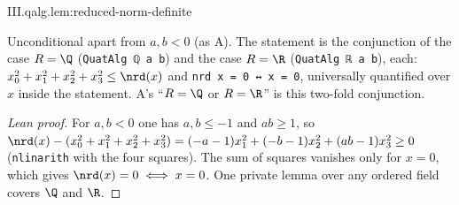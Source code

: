 \begin{lemma}
\end{lemma}
\begin{tfformal}{III.qalg.lem:reduced-norm-definite}
\begin{tffidelity}
Unconditional apart from $a,b<0$ (as A). The statement is the conjunction of the case $R=\Q$ (\texttt{QuatAlg ℚ a b}) and the case $R=\R$ (\texttt{QuatAlg ℝ a b}), each: $x_0^2+x_1^2+x_2^2+x_3^2\le\nrd(x)$ and \texttt{nrd x = 0 ↔ x = 0}, universally quantified over $x$ inside the statement. A's ``$R=\Q$ or $R=\R$'' is this two-fold conjunction.
\end{tffidelity}
\end{tfformal}
\begin{proof}[Lean proof]
For $a,b<0$ one has $a,b\le-1$ and $ab\ge1$, so $\nrd(x)-(x_0^2+x_1^2+x_2^2+x_3^2)=(-a-1)x_1^2+(-b-1)x_2^2+(ab-1)x_3^2\ge0$ (\texttt{nlinarith} with the four squares). The sum of squares vanishes only for $x=0$, which gives $\nrd(x)=0\iff x=0$. One private lemma over any ordered field covers $\Q$ and $\R$.
\end{proof}

